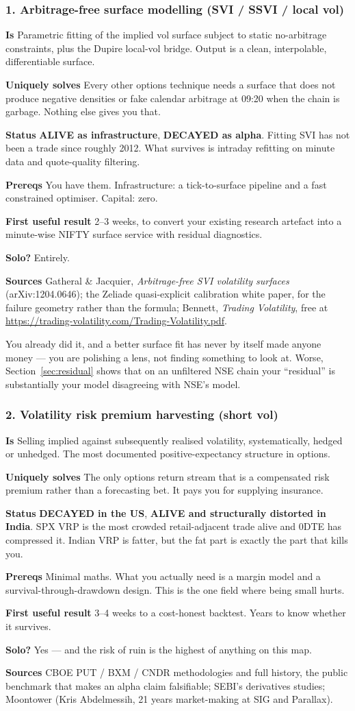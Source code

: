 \documentclass[11pt,a4paper]{article}
\newcommand{\alv}[1]{\textcolor{alive}{\textbf{#1}}}
\newcommand{\dec}[1]{\textcolor{decayed}{\textbf{#1}}}
\newcommand{\fitem}[1]{\par\smallskip\noindent\textbf{#1} }
\begin{document}
\subsubsection{1. Arbitrage-free surface modelling (SVI / SSVI / local vol)}
\fitem{Is}Parametric fitting of the implied vol surface subject to static
no-arbitrage constraints, plus the Dupire local-vol bridge. Output is a clean,
interpolable, differentiable surface.
\fitem{Uniquely solves}Every other options technique needs a surface that does
not produce negative densities or fake calendar arbitrage at 09:20 when the chain
is garbage. Nothing else gives you that.
\fitem{Status}\alv{ALIVE as infrastructure}, \dec{DECAYED as alpha}. Fitting SVI
has not been a trade since roughly 2012. What survives is intraday refitting on
minute data and quote-quality filtering.
\fitem{Prereqs}You have them. Infrastructure: a tick-to-surface pipeline and a
fast constrained optimiser. Capital: zero.
\fitem{First useful result}2--3 weeks, to convert your existing research artefact
into a minute-wise NIFTY surface service with residual diagnostics.
\fitem{Solo?}Entirely.
\fitem{Sources}Gatheral \& Jacquier, \emph{Arbitrage-free SVI volatility
surfaces} (arXiv:1204.0646); the Zeliade quasi-explicit calibration white paper,
for the failure geometry rather than the formula; Bennett, \emph{Trading
Volatility}, free at \url{https://trading-volatility.com/Trading-Volatility.pdf}.

\begin{waste}
You already did it, and a better surface fit has never by itself made anyone
money --- you are polishing a lens, not finding something to look at. Worse,
Section~\ref{sec:residual} shows that on an unfiltered NSE chain your
``residual'' is substantially your model disagreeing with NSE's model.
\end{waste}

\subsubsection{2. Volatility risk premium harvesting (short vol)}
\fitem{Is}Selling implied against subsequently realised volatility,
systematically, hedged or unhedged. The most documented positive-expectancy
structure in options.
\fitem{Uniquely solves}The only options return stream that is a compensated risk
premium rather than a forecasting bet. It pays you for supplying insurance.
\fitem{Status}\dec{DECAYED in the US}, \alv{ALIVE and structurally distorted in
India}. SPX VRP is the most crowded retail-adjacent trade alive and 0DTE has
compressed it. Indian VRP is fatter, but the fat part is exactly the part that
kills you.
\fitem{Prereqs}Minimal maths. What you actually need is a margin model and a
survival-through-drawdown design. This is the one field where being small hurts.
\fitem{First useful result}3--4 weeks to a cost-honest backtest. Years to know
whether it survives.
\fitem{Solo?}Yes --- and the risk of ruin is the highest of anything on this map.
\fitem{Sources}CBOE PUT / BXM / CNDR methodologies and full history, the public
benchmark that makes an alpha claim falsifiable; SEBI's derivatives studies;
Moontower (Kris Abdelmessih, 21 years market-making at SIG and Parallax).
\end{document}
